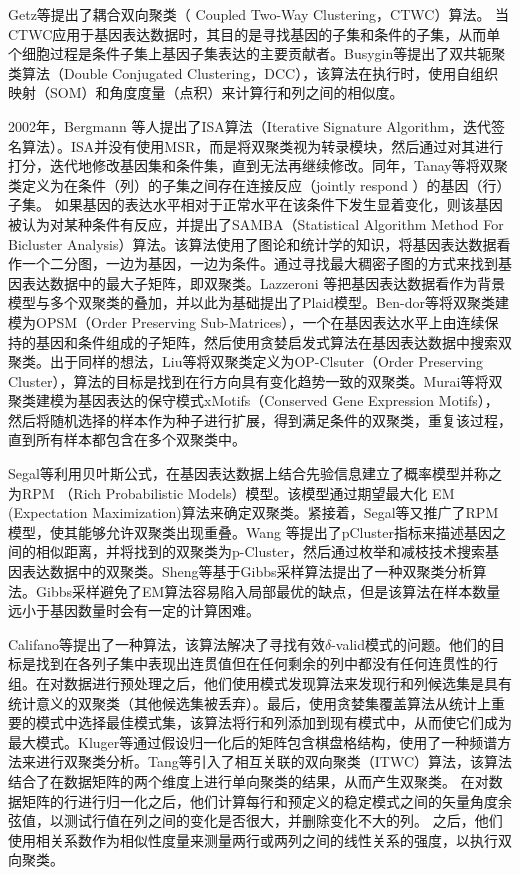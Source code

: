     Getz等提出了耦合双向聚类（ Coupled Two-Way Clustering，CTWC）算法。 当CTWC应用于基因表达数据时，其目的是寻找基因的子集和条件的子集，从而单个细胞过程是条件子集上基因子集表达的主要贡献者。Busygin等提出了双共轭聚类算法（Double Conjugated Clustering，DCC），该算法在执行时，使用自组织映射（SOM）和角度度量（点积）来计算行和列之间的相似度。

    2002年，Bergmann 等人提出了ISA算法（Iterative Signature Algorithm，迭代签名算法）。ISA并没有使用MSR，而是将双聚类视为转录模块，然后通过对其进行打分，迭代地修改基因集和条件集，直到无法再继续修改。同年，Tanay等将双聚类定义为在条件（列）的子集之间存在连接反应（jointly respond ）的基因（行）子集。 如果基因的表达水平相对于正常水平在该条件下发生显着变化，则该基因被认为对某种条件有反应，并提出了SAMBA（Statistical Algorithm Method For Bicluster Analysis）算法。该算法使用了图论和统计学的知识，将基因表达数据看作一个二分图，一边为基因，一边为条件。通过寻找最大稠密子图的方式来找到基因表达数据中的最大子矩阵，即双聚类。Lazzeroni 等把基因表达数据看作为背景模型与多个双聚类的叠加，并以此为基础提出了Plaid模型。Ben-dor等将双聚类建模为OPSM（Order Preserving Sub-Matrices），一个在基因表达水平上由连续保持的基因和条件组成的子矩阵，然后使用贪婪启发式算法在基因表达数据中搜索双聚类。出于同样的想法，Liu等将双聚类定义为OP-Clsuter（Order Preserving Cluster），算法的目标是找到在行方向具有变化趋势一致的双聚类。Murai等将双聚类建模为基因表达的保守模式xMotifs（Conserved Gene Expression Motifs），然后将随机选择的样本作为种子进行扩展，得到满足条件的双聚类，重复该过程，直到所有样本都包含在多个双聚类中。

    Segal等利用贝叶斯公式，在基因表达数据上结合先验信息建立了概率模型并称之为RPM （Rich Probabilistic Models）模型。该模型通过期望最大化 EM (Expectation Maximization)算法来确定双聚类。紧接着，Segal等又推广了RPM模型，使其能够允许双聚类出现重叠。Wang 等提出了pCluster指标来描述基因之间的相似距离，并将找到的双聚类为p-Cluster，然后通过枚举和减枝技术搜索基因表达数据中的双聚类。Sheng等基于Gibbs采样算法提出了一种双聚类分析算法。Gibbs采样避免了EM算法容易陷入局部最优的缺点，但是该算法在样本数量远小于基因数量时会有一定的计算困难。

    Califano等提出了一种算法，该算法解决了寻找有效$\delta$-valid模式的问题。他们的目标是找到在各列子集中表现出连贯值但在任何剩余的列中都没有任何连贯性的行组。在对数据进行预处理之后，他们使用模式发现算法来发现行和列候选集是具有统计意义的双聚类（其他候选集被丢弃）。最后，使用贪婪集覆盖算法从统计上重要的模式中选择最佳模式集，该算法将行和列添加到现有模式中，从而使它们成为最大模式。Kluger等通过假设归一化后的矩阵包含棋盘格结构，使用了一种频谱方法来进行双聚类分析。Tang等引入了相互关联的双向聚类（ITWC）算法，该算法结合了在数据矩阵的两个维度上进行单向聚类的结果，从而产生双聚类。 在对数据矩阵的行进行归一化之后，他们计算每行和预定义的稳定模式之间的矢量角度余弦值，以测试行值在列之间的变化是否很大，并删除变化不大的列。 之后，他们使用相关系数作为相似性度量来测量两行或两列之间的线性关系的强度，以执行双向聚类。

